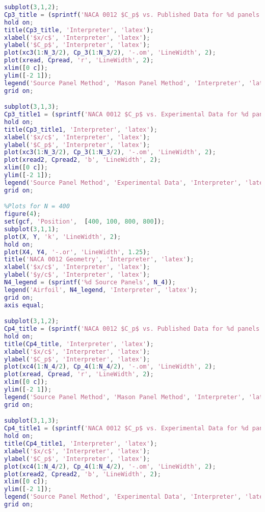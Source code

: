 \documentclass[12pt]{article}
\begin{document}
\begin{lstlisting}[language=Matlab]
subplot(3,1,2);
Cp3_title = (sprintf('NACA 0012 $C_p$ vs. Published Data for %d panels', N_3));
hold on;
title(Cp3_title, 'Interpreter', 'latex');
xlabel('$x/c$', 'Interpreter', 'latex');
ylabel('$C_p$', 'Interpreter', 'latex');
plot(xc3(1:N_3/2), Cp_3(1:N_3/2), '-.om', 'LineWidth', 2);
plot(xread, Cpread, 'r', 'LineWidth', 2);
xlim([0 c]);
ylim([-2 1]);
legend('Source Panel Method', 'Mason Panel Method', 'Interpreter', 'latex');
grid on;

subplot(3,1,3);
Cp3_title1 = (sprintf('NACA 0012 $C_p$ vs. Experimental Data for %d panels', N_3));
hold on;
title(Cp3_title1, 'Interpreter', 'latex');
xlabel('$x/c$', 'Interpreter', 'latex');
ylabel('$C_p$', 'Interpreter', 'latex');
plot(xc3(1:N_3/2), Cp_3(1:N_3/2), '-.om', 'LineWidth', 2);
plot(xread2, Cpread2, 'b', 'LineWidth', 2);
xlim([0 c]);
ylim([-2 1]);
legend('Source Panel Method', 'Experimental Data', 'Interpreter', 'latex');
grid on;

%Plots for N = 400
figure(4);
set(gcf, 'Position',  [400, 100, 800, 800]);
subplot(3,1,1);
plot(X, Y, 'k', 'LineWidth', 2);
hold on;
plot(X4, Y4, '-.or', 'LineWidth', 1.25);
title('NACA 0012 Geometry', 'Interpreter', 'latex');
xlabel('$x/c$', 'Interpreter', 'latex');
ylabel('$y/c$', 'Interpreter', 'latex');
N4_legend = (sprintf('%d Source Panels', N_4));
legend('Airfoil', N4_legend, 'Interpreter', 'latex');
grid on;
axis equal;

subplot(3,1,2);
Cp4_title = (sprintf('NACA 0012 $C_p$ vs. Published Data for %d panels', N_4));
hold on;
title(Cp4_title, 'Interpreter', 'latex');
xlabel('$x/c$', 'Interpreter', 'latex');
ylabel('$C_p$', 'Interpreter', 'latex');
plot(xc4(1:N_4/2), Cp_4(1:N_4/2), '-.om', 'LineWidth', 2);
plot(xread, Cpread, 'r', 'LineWidth', 2);
xlim([0 c]);
ylim([-2 1]);
legend('Source Panel Method', 'Mason Panel Method', 'Interpreter', 'latex');
grid on;

subplot(3,1,3);
Cp4_title1 = (sprintf('NACA 0012 $C_p$ vs. Experimental Data for %d panels', N_4));
hold on;
title(Cp4_title1, 'Interpreter', 'latex');
xlabel('$x/c$', 'Interpreter', 'latex');
ylabel('$C_p$', 'Interpreter', 'latex');
plot(xc4(1:N_4/2), Cp_4(1:N_4/2), '-.om', 'LineWidth', 2);
plot(xread2, Cpread2, 'b', 'LineWidth', 2);
xlim([0 c]);
ylim([-2 1]);
legend('Source Panel Method', 'Experimental Data', 'Interpreter', 'latex');
grid on;


\end{lstlisting}
\end{document}
